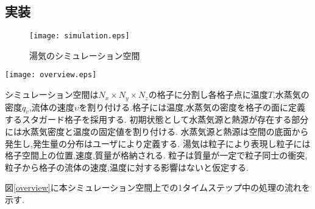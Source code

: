\subsection{実装}

\begin{figure}[h]
\texttt{[image: simulation.eps]}
\caption{湯気のシミュレーション空間}
\label{simulation}
\end{figure}

\begin{figure*}[h]
\centering
\texttt{[image: overview.eps]}
\caption{提案法の概要}
\label{overview}
\end{figure*}

シミュレーション空間は$N_{x} \times N_{y} \times N_{z}$の格子に分割し各格子点に温度$T$,水蒸気の密度$q_{v}$,流体の速度$\upsilon$を割り付ける.格子には温度,水蒸気の密度を格子の面に定義するスタガード格子を採用する.
初期状態として水蒸気源と熱源が存在する部分には水蒸気密度と温度の固定値を割り付ける.
水蒸気源と熱源は空間の底面から発生し,発生量の分布はユーザにより定義する.
湯気は粒子により表現し粒子には格子空間上の位置,速度,質量が格納される.
粒子は質量が一定で粒子同士の衝突,粒子から格子の流体の速度,温度に対する影響はないと仮定する.

図\ref{overview}に本シミュレーション空間上での1タイムステップ中の処理の流れを示す.

